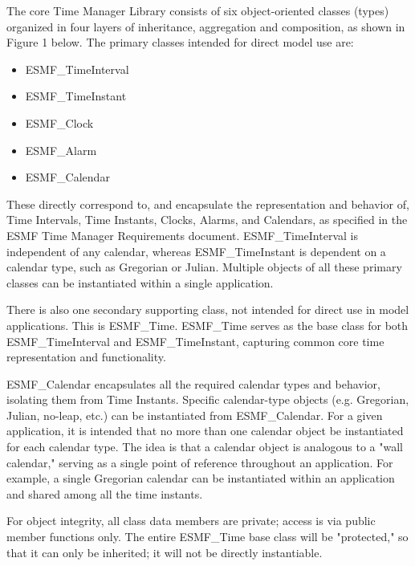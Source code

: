 

The core Time Manager Library consists of six object-oriented classes (types)
organized in four layers of inheritance, aggregation and composition,
as shown in Figure 1 below.  The primary classes intended for
direct model use are:

\begin{itemize}
\item ESMF\_TimeInterval
\item ESMF\_TimeInstant
\item ESMF\_Clock
\item ESMF\_Alarm
\item ESMF\_Calendar
\end{itemize}

These directly correspond to, and encapsulate the representation and
behavior of, Time Intervals, Time Instants, Clocks, Alarms, and Calendars,
as specified in the ESMF Time Manager Requirements document.
ESMF\_TimeInterval is independent of any calendar, whereas ESMF\_TimeInstant
is dependent on a calendar type, such as Gregorian or Julian.  Multiple
objects of all these primary classes can be instantiated within a single
application.

There is also one secondary supporting class, not intended for direct
use in model applications.  This is ESMF\_Time.  ESMF\_Time serves as the
base class for both ESMF\_TimeInterval and ESMF\_TimeInstant, capturing
common core time representation and functionality.

ESMF\_Calendar encapsulates all the required calendar types and behavior,
isolating them from Time Instants.  Specific calendar-type objects (e.g.
Gregorian, Julian, no-leap, etc.) can be instantiated from ESMF\_Calendar.
For a given application, it is intended that no more than one calendar
object be instantiated for each calendar type.  The idea is that a calendar
object is analogous to a "wall calendar," serving as a single point of
reference throughout an application.  For example, a single Gregorian
calendar can be instantiated within an application and shared among all
the time instants.

For object integrity, all class data members are private; access is via
public member functions only. The entire ESMF\_Time base class will be
"protected," so that it can only be inherited; it will not be directly
instantiable.

